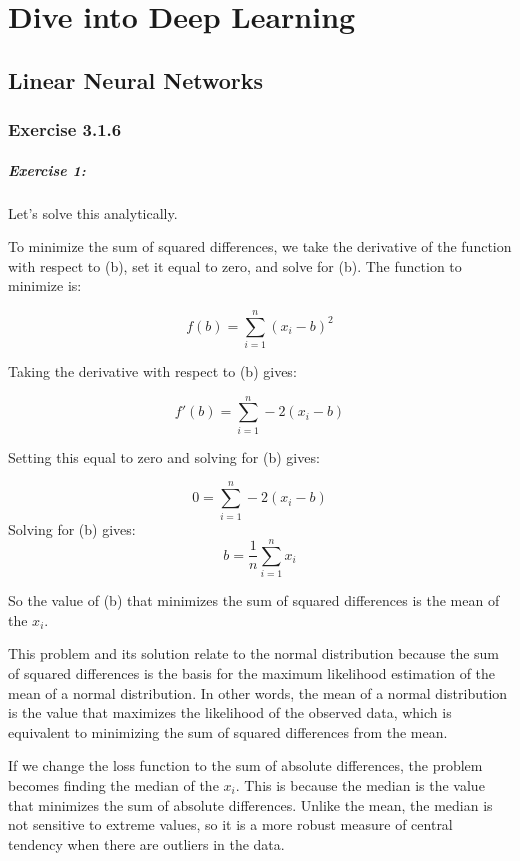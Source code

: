 \chapter{Dive into Deep Learning}\label{chp:dive-into-deep-learning}
\minitoc

\section{Linear Neural Networks}\label{sec:Linear Neural Networks}

\subsection{Exercise 3.1.6}

\paragraph{Exercise 1:}

Let’s solve this analytically.

To minimize the sum of squared differences, we take the derivative of the function with respect to (b), set it equal to zero, and solve for (b).
The function to minimize is:

\[
	f(b) = \sum_{i=1}^{n} \left(x_i - b\right)^2
\]

Taking the derivative with respect to (b) gives:

\[
	f'(b) = \sum_{i=1}^{n} -2\left(x_i - b\right)
\]

Setting this equal to zero and solving for (b) gives:

\[
	0 = \sum_{i=1}^{n} -2(x_i - b)
\]
Solving for (b) gives:
\[
	b = \frac{1}{n} \sum_{i=1}^{n} x_i
\]

So the value of (b) that minimizes the sum of squared differences is the mean of the \(x_i\).

This problem and its solution relate to the normal distribution because the sum of squared differences is the basis for the maximum likelihood estimation of the mean of a normal distribution.
In other words, the mean of a normal distribution is the value that maximizes the likelihood of the observed data, which is equivalent to minimizing the sum of squared differences from the mean.


If we change the loss function to the sum of absolute differences, the problem becomes finding the median of the \(x_i\).
This is because the median is the value that minimizes the sum of absolute differences.
Unlike the mean, the median is not sensitive to extreme values, so it is a more robust measure of central tendency when there are outliers in the data.

